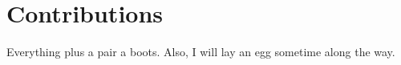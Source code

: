 \section{Contributions}
\label{sec:int_contributions}

Everything plus a pair a boots. Also, I will lay an egg sometime along the way.